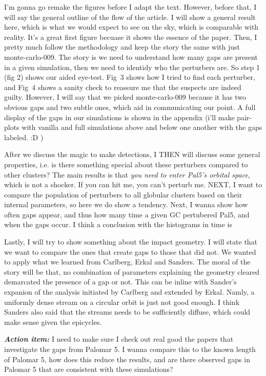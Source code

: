 \documentclass[]{aa}
\begin{document}
  I'm gonna go remake the figures before I adapt the text. However, before that, I will say the general outline of the flow of the article. I will show a general result here, which is what we would expect to see on the sky, which is comparable with reality. It's a great first figure becuase it shows the essence of the paper. Then, I pretty much follow the methodology and keep the story the same with just monte-carlo-009. The story is we need to understand how many gaps are present in a given simulation, then we need to identidy who the perturbers are. So step 1 (fig 2) shows our aided eye-test. Fig~3 shows how I tried to find each perturber, and Fig~4 shows a sanity check to reassure me that the suspects are indeed guilty. However, I will say that we picked monte-carlo-009 because it has two obvious gaps and two subtle ones, which aid in communicating our point. A full display of the gaps in our simulations is shown in the appendix (i'll make pair-plots with vanilla and full simulations above and below one another with the gaps labeled. :D ) 

  After we discuss the magic to make detections, I THEN will discuss some general properties, i.e. is there something special about these perturbers compared to other clusters? The main results is that \textit{you need to enter Pal5's orbital space}, which is not a shocker. If you can hit me, you can't perturb me. NEXT, I want to compare the population of perturbers to all globular clusters based on their internal parameters, so here we do show a tendency. Next, I wanna show how often gaps appear, and thus how many time a given GC pertubered Pal5, and when the gaps occur. I think a conclusion with the histograms in time is 

  Lastly, I will try to show something about the impact geometry. I will state that we want to compare the ones that create gaps to those that did not. We wanted to apply what we learned from Carlberg, Erkal and Sanders. The moral of the story will be that, no combination of parameters explaining the geometry cleared demarcated the presence of a gap or not. This can be inline with Sander's expanion of the analysis initiated by Carlberg and extended by Erkal. Namly, a uniformly dense stream on a circular orbit is just not good enough. I think Sanders also said that the streams needs to be sufficiently diffuse, which could make sense given the epicycles. 


  \textbf{\textit{Action item:}} I need to make sure I check out real good the papers that investigate the gaps from Palomar 5. I wanna compare this to the known length of Palomar 5, how does this reduce the results, and are there observed gaps in Palomar 5 that are consistent with these simulations? 
\end{document}
